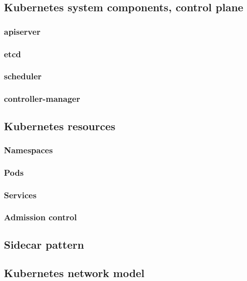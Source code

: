\documentclass[english,12pt,a4paper,pdftex,sci,utf8]{aaltothesis}
\begin{document}
\subsection{Kubernetes system components, control plane}
\subsubsection{apiserver}
\subsubsection{etcd}
\subsubsection{scheduler}
\subsubsection{controller-manager}

\subsection{Kubernetes resources}
\subsubsection{Namespaces}
\subsubsection{Pods}
\subsubsection{Services}
\subsubsection{Admission control}

\subsection{Sidecar pattern}

\subsection{Kubernetes network model}

\end{document}
